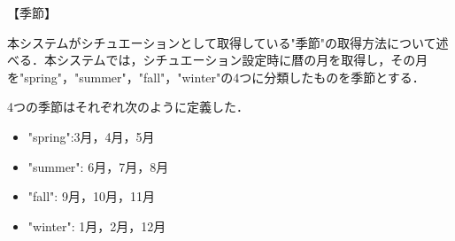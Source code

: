 【季節】
\par 本システムがシチュエーションとして取得している"季節"の取得方法について述べる．本システムでは，シチュエーション設定時に暦の月を取得し，その月を"spring"，"summer"，"fall"，"winter"の4つに分類したものを季節とする．
\par 4つの季節はそれぞれ次のように定義した．
\begin{itemize}
 \item "spring":3月，4月，5月
 \item "summer": 6月，7月，8月
 \item "fall": 9月，10月，11月
 \item "winter": 1月，2月，12月
\end{itemize}
